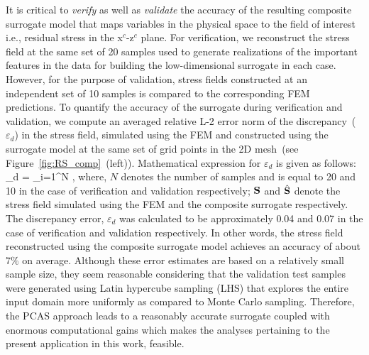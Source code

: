 It is critical to \textit{verify} as well as \textit{validate} the accuracy of the resulting composite surrogate model
that maps variables in the physical space to the field of interest i.e., residual stress in the x$^c$-z$^c$ plane. 
For verification, we reconstruct the stress field at the same set of 20 samples used to generate realizations
of the important features in the data for building the low-dimensional surrogate in each case. However, for the
purpose of validation, stress fields constructed at an independent set of 10 samples is compared to the
corresponding FEM predictions. To quantify the accuracy of the surrogate during verification and validation,
we compute an averaged relative L-2 error norm of the discrepancy~($\varepsilon_d$) in the stress field, simulated using
the FEM and constructed using the surrogate model at the same set of grid points in the 
2D mesh~(see Figure~\ref{fig:RS_comp}~(left)). Mathematical expression for $\varepsilon_d$ is given as
follows:
%
\be
\varepsilon_{d} = \sum\limits_{i=1}^{N} ,
\label{eq:test}
\ee
%
where, $N$ denotes the number of samples and is equal to 20 and 10 in the case of verification and validation
respectively; $\mathbf{{S}}$ and $\hat{\mathbf{{S}}}$ denote the stress field simulated using the FEM and the composite
surrogate respectively. The discrepancy error, $\varepsilon_d$ was calculated to be approximately 0.04 and 
0.07 in the case of verification and validation respectively. In other words, the stress field reconstructed using the
composite surrogate model achieves an accuracy of about 7$\%$ on average. Although these error estimates
are based on a relatively small sample size, they seem reasonable considering that the validation test samples
were generated using Latin hypercube sampling (LHS) that explores the entire input domain more uniformly
as compared to Monte Carlo sampling. Therefore, the PCAS approach leads to a reasonably 
accurate surrogate coupled with enormous computational gains which makes the analyses pertaining to
the present application in this work, feasible. 

